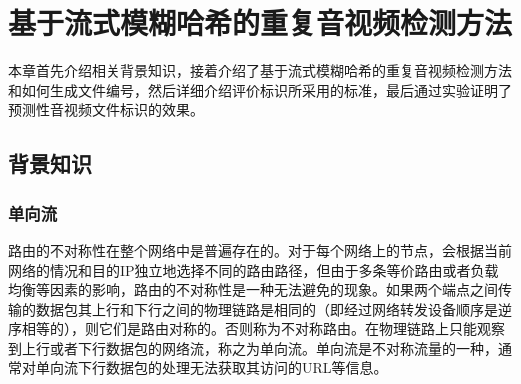 \chapter{基于流式模糊哈希的重复音视频检测方法}\label{chap:introduction}

本章首先介绍相关背景知识，接着介绍了基于流式模糊哈希的重复音视频检测方法和如何生成文件编号，然后详细介绍评价标识所采用的标准，最后通过实验证明了预测性音视频文件标识的效果。

\section{背景知识}

\subsection{单向流}
路由的不对称性在整个网络中是普遍存在的。对于每个网络上的节点，会根据当前网络的情况和目的IP独立地选择不同的路由路径，但由于多条等价路由或者负载均衡等因素的影响，路由的不对称性是一种无法避免的现象。如果两个端点之间传输的数据包其上行和下行之间的物理链路是相同的（即经过网络转发设备顺序是逆序相等的），则它们是路由对称的。否则称为不对称路由。在物理链路上只能观察到上行或者下行数据包的网络流，称之为单向流。单向流是不对称流量的一种，通常对单向流下行数据包的处理无法获取其访问的URL等信息。

